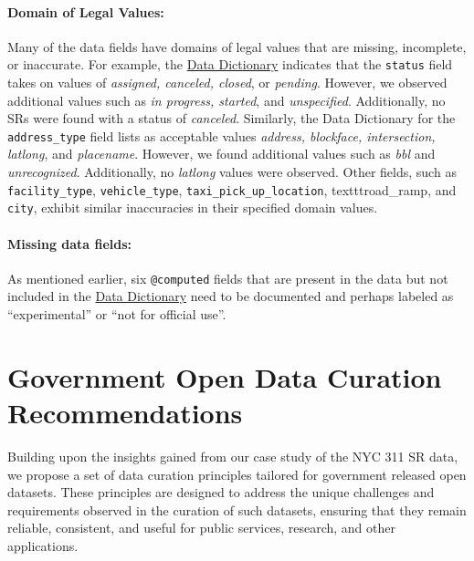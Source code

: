 \documentclass[linenumber]{jdsart}
\begin{document}
\paragraph{Domain of Legal Values:} Many of the data fields have
domains of legal values that are missing, incomplete, or inaccurate. For 
example, the \href{https://data.cityofnewyork.us/api/views/erm2-nwe9/files/b372b884-f86a-453b-ba16-1fe06ce9d212?download=true&filename=311_ServiceRequest_2010-Present_DataDictionary_Updated_2023.xlsx}{Data Dictionary} indicates 
that the \texttt{status} field takes on values of \textit{assigned, canceled, 
closed}, or \textit{pending}. However, we observed additional values 
such as \textit{in progress, started}, and \textit{unspecified}. Additionally, 
no SRs were found with a status of \textit{canceled}. Similarly, 
the Data Dictionary for the \texttt{address\_type} field lists as acceptable
values \textit{address, blockface, intersection, latlong}, and 
\textit{placename}. However, we found additional values such 
as \textit{bbl} and \textit{unrecognized}. Additionally, no 
\textit{latlong} values were observed. Other fields, such 
as \texttt{facility\_type}, \texttt{vehicle\_type}, \texttt{taxi\_pick\_up\_location},
texttt{road\_ramp}, and \texttt{city}, exhibit similar inaccuracies 
in their specified domain values.

\paragraph{Missing data fields:} As mentioned earlier, six \texttt{@computed} 
fields that are present in the data but not included in 
the \href{https://data.cityofnewyork.us/api/views/erm2-nwe9/files/b372b884-f86a-453b-ba16-1fe06ce9d212?download=true&filename=311_ServiceRequest_2010-Present_DataDictionary_Updated_2023.xlsx}{Data Dictionary} need
to be documented and perhaps labeled as ``experimental'' 
or ``not for official use''.


\section{Government Open Data Curation Recommendations}
\label{sec:recommendations}
Building upon the insights gained from our case study of the 
NYC 311 SR data, we propose a set of data 
curation principles tailored for government released open datasets. 
These principles are designed to address the unique challenges 
and requirements observed in the curation of such datasets, 
ensuring that they remain reliable, consistent, and useful for 
public services, research, and other applications.
\end{document}
